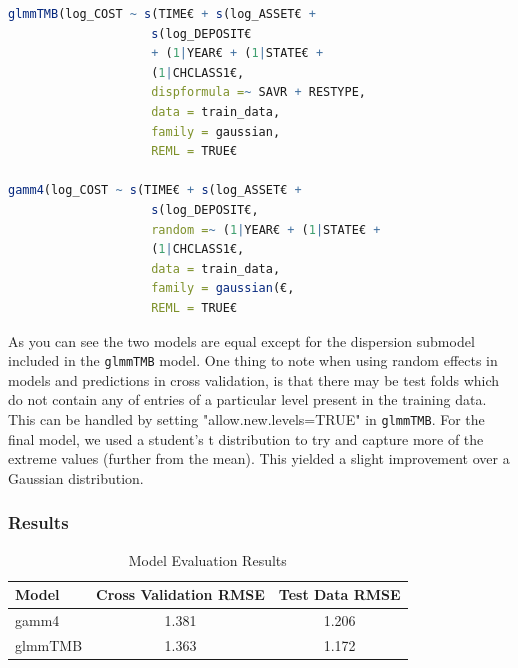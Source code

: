 \documentclass[12pt, twoside,hidelinks]{article}
\theoremstyle{definition}
\numberwithin{equation}{section}
\begin{document}
\begin{lstlisting}[language=R]
glmmTMB(log_COST ~ s(TIME€ + s(log_ASSET€ + 
                    s(log_DEPOSIT€
                    + (1|YEAR€ + (1|STATE€ + 
                    (1|CHCLASS1€,
                    dispformula =~ SAVR + RESTYPE,
                    data = train_data, 
                    family = gaussian,
                    REML = TRUE€

gamm4(log_COST ~ s(TIME€ + s(log_ASSET€ +       
                    s(log_DEPOSIT€,
                    random =~ (1|YEAR€ + (1|STATE€ + 
                    (1|CHCLASS1€,
                    data = train_data, 
                    family = gaussian(€, 
                    REML = TRUE€
\end{lstlisting}

As you can see the two models are equal except for the dispersion submodel included in the \texttt{glmmTMB} model. One thing to note when using random effects in models and predictions in cross validation, is that there may be test folds which do not contain any of entries of a particular level present in the training data. This can be handled by setting "allow.new.levels=TRUE" in \texttt{glmmTMB}. 
For the final model, we used a student's t distribution to try and capture more of the extreme values (further from the mean). This yielded a slight improvement over a Gaussian distribution. 

\subsubsection{Results}

\begin{table}[H]
\centering
\caption{Model Evaluation Results}
\label{table:model_evaluation}
\begin{tabular}{lcc}
\hline
\textbf{Model} & \textbf{Cross Validation RMSE} & \textbf{Test Data RMSE} \\
\hline
gamm4 & 1.381 & 1.206 \\
glmmTMB & 1.363 & 1.172 \\
\hline
\end{tabular}
\end{table}
\end{document}
